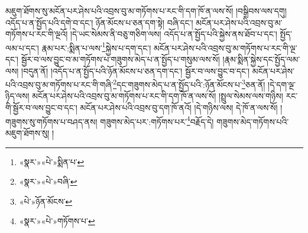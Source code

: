 མཇུག་ཐོགས་སུ་མངོན་པར་ཤེས་པའི་འབྲས་བུ་མ་གཏོགས་པ་རང་གི་དག་ཁོ་ན་ལས་སོ། །བསྒྲིབས་ལས་དགུ། འདོད་པ་ན་སྤྱོད་པའི་དགེ་བ་དང་། ཉོན་མོངས་པ་ཅན་དག་སྟེ། བཞི་དང་། མངོན་པར་ཤེས་པའི་འབྲས་བུ་མ་གཏོགས་པ་རང་གི་ལྔའོ། །དེ་ཡང་སེམས་ནི་བཅུ་གཅིག་ལས། འདོད་པ་ན་སྤྱོད་པའི་སྐྱེས་ནས་ཐོབ་པ་དང་། སྤྱོད་ལམ་པ་དང་། རྣམ་པར་:སྨིན་པ་ལས་\footnote{«སྣར་»«པེ་»སྨིན་པ་}སྐྱེས་པ་དག་དང་། མངོན་པར་ཤེས་པའི་འབྲས་བུ་མ་གཏོགས་པ་རང་གི་ལྔ་དང་། སྦྱོར་བ་ལས་བྱུང་བ་མ་གཏོགས་པ་གཟུགས་མེད་པ་ན་སྤྱོད་པ་གསུམ་ལས་སོ། །རྣམ་སྨིན་སྐྱེས་དང་སྤྱོད་ལམ་ལས། །བདུན་ནོ། །འདོད་པ་ན་སྤྱོད་པའི་ཉོན་མོངས་པ་ཅན་དག་དང་། སྦྱོར་བ་ལས་བྱུང་བ་དང་། མངོན་པར་ཤེས་པའི་འབྲས་བུ་མ་གཏོགས་པ་རང་གི་གཞི་\footnote{«སྣར་»«པེ་»བཞི་}དང་གཟུགས་མེད་པ་ན་སྤྱོད་པའི་:ཉོན་མོངས་པ་\footnote{«པེ་»ཉོན་མོངས་}ཅན་ནོ། །དེ་དག་ལྔ་ཉིད་ལས། མངོན་པར་ཤེས་པའི་འབྲས་བུ་མ་གཏོགས་པ་རང་གི་དག་ཁོ་ན་ལས་སོ། །སྤྲུལ་སེམས་ལས་གཉིས། རང་གི་སྦྱོར་བ་ལས་བྱུང་བ་དང་། མངོན་པར་ཤེས་པའི་འབྲས་བུ་དག་ཁོ་ནའོ། །དེ་གཉིས་ལས། དེ་ཁོ་ན་ལས་སོ། །གཟུགས་སུ་གཏོགས་པ་བཤད་ནས། གཟུགས་མེད་པར་:གཏོགས་པར་\footnote{«སྣར་»«པེ་»གཏོགས་པ་}བརྗོད་དེ། གཟུགས་མེད་གཏོགས་པའི་མཇུག་ཐོགས་སུ། །
